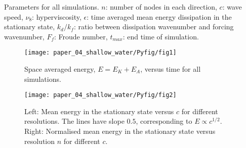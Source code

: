 \begin{table}
\begin{center}
\vskip 3mm
\caption{Parameters for all simulations. $ n $: number of nodes in each
direction, $ c $: wave speed, $ \nu_8 $: hyperviscosity, $ \epsilon $: time
averaged mean energy dissipation in the stationary state, $ k_{d}/ k_f $: ratio
between dissipation wavenumber and forcing wavenumber, $ F_f $: Froude
number, $ t_{max} $: end time of simulation.}
\end{center}
\end{table}





\begin{figure}
\centerline{\texttt{[image: paper\_04\_shallow\_water/Pyfig/fig1]}}
\caption{Space averaged energy, $E = E_K + E_A $, versus time for all
simulations. }
\label{fig_Evstime}
\end{figure}

\begin{figure}
\centerline{\texttt{[image: paper\_04\_shallow\_water/Pyfig/fig2]}}
\caption{Left: Mean energy in the stationary state versus $ c $ for different
resolutions. The lines have slope $ 0.5 $, corresponding to $ E \propto c^{1/2}
$. Right: Normalised mean energy in the stationary state versus resolution $ n
$ for different $ c $.}
\label{MeanE}
\end{figure}



